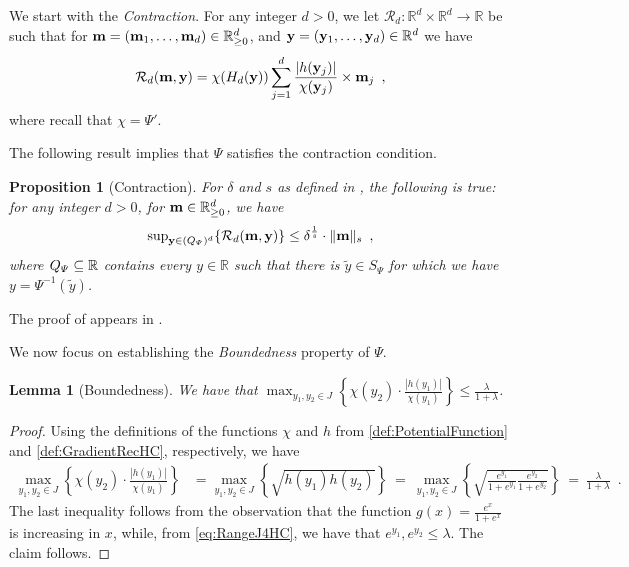 \documentclass[11pt,reqno]{amsart}
\numberwithin{equation}{section}
\newtheorem{lemma}[theorem]{Lemma}
\newtheorem{proposition}[theorem]{Proposition}
\newcommand{\cR}{{\mathcal{R}}}
\newcommand{\blue}[1]{{\color{blue}#1}}
\newcommand{\cadmiumgreen}[1]{{\color{cadmiumgreen}#1}}
\newcommand{\cadmiumorange}[1]{{\color{cadmiumorange}#1}}
\newcommand{\goldenbrown}[1]{{\color{goldenbrown}#1}}
\newcommand{\heliotrope}[1]{{\color{heliotrope}#1}}
\newcommand{\potF}{{\Psi}}
\newcommand{\xdpotF}{\chi}
\newcommand{\logtrecur}{H}
\newcommand{\dlogtrecur}{h}
\newcommand{\ratiorange}{J}
\newcommand{\norm}[2]{\goldenbrown{\|} #1 \goldenbrown{\|}_{#2}}
\newcommand{\abs}[1]{\blue{|}#1\blue{|}}
\renewcommand{\blue}[1]{#1}
\renewcommand{\cadmiumgreen}[1]{#1}
\renewcommand{\cadmiumorange}[1]{#1}
\renewcommand{\goldenbrown}[1]{#1}
\renewcommand{\heliotrope}[1]{#1}
\newcommand{\kx}{\heliotrope{x}}
\newcommand{\ky}{\cadmiumorange{y}}%
\renewcommand{\kx}{x}
\renewcommand{\ky}{\cadmiumgreen{y}}
\begin{document}
We start with the {\em Contraction}. For any integer $d>0$, we let 
$\cR_{d}:\mathbb{R}^d\times \mathbb{R}^d \to \mathbb{R}$ be such that 
for ${\bf m}=({\bf m}_1, \ldots, {\bf m}_d)\in \mathbb{R}^{d}_{\geq 0}$, and 
${\bf \ky}=({\bf \ky}_1, \ldots, {\bf \ky}_d) \in \mathbb{R}^d$ we have  
{\small 
\begin{align}
\cR_{d}({\bf m}, {\bf \ky})={\textstyle \xdpotF(\logtrecur_{d}({\bf \ky})) }\sum^{d}_{j=1}
\frac{ \abs{ \dlogtrecur( {\bf \ky}_j ) }}{ \xdpotF( {\bf \ky}_j )} 
\times {\bf m}_j \enspace, \nonumber
\end{align}
}
where recall that $\xdpotF=\potF'$.


The following result implies that $\potF$ satisfies the contraction condition.
\begin{proposition}[Contraction]\label{prop:PotContracts}
%
For $\delta$ and $s$ as defined in , the following is true: 
for any integer $d>0$, for ${\bf m}\in \mathbb{R}^{d}_{\geq 0}$, we have 
\begin{align}
\sup\nolimits_{{\bf \ky}\in (\easyspace)^d }\{ \cR_{d}({\bf m}, {\bf y}) \} \leq \delta^{\frac{1}{s}} \cdot \norm{ {\bf m}}{s} \enspace,
\end{align}
where $\easyspace \subseteq \mathbb{R}$ contains every $y \in \mathbb{R}$ such that there is 
$\tilde{y} \in S_{\potF} $ for which we have ${y}=\potF^{-1}(\tilde{y})$. 
\end{proposition}

The proof of  appears in .


 We now focus on establishing the {\em Boundedness} property of $\potF$.






\begin{lemma}[Boundedness]\label{lemma:PotBooundedness}
We have that $\textstyle \max_{\ky_1, \ky_2\in \ratiorange }\left\{ \xdpotF(\ky_2) \cdot \frac{|\dlogtrecur(\ky_1)|}{\xdpotF(\ky_1)} \right\} 
\leq \frac{\lambda}{1+\lambda}$.
\end{lemma}
\begin{proof}
Using the definitions of the functions $\xdpotF$ and $\dlogtrecur$ from \eqref{def:PotentialFunction} and 
\eqref{def:GradientRecHC}, respectively, we have
{\small 
\begin{align}
 \max_{\ky_1,\ky_2\in \ratiorange }\left\{ \xdpotF(\ky_2) \cdot \frac{|\dlogtrecur(\ky_1)|}{\xdpotF(\ky_1)} \right\} &=
 \max_{\ky_1,\ky_2\in \ratiorange} \left\{\sqrt{\dlogtrecur(\ky_1)\dlogtrecur(\ky_2) } \right\} %
 \ =\ \max_{\ky_1,\ky_2\in \ratiorange} \left\{\sqrt{ \frac{e^{\ky_1}}{1+e^{\ky_1}}\frac{e^{\ky_2}}{1+e^{\ky_2}} } \right\} 
\ =\ { \frac{\lambda}{1+\lambda}} \enspace. \nonumber 
\end{align}
}
The last inequality follows from the observation that the function $g(\kx)=\frac{e^{\kx}}{1+e^{\kx}}$ is increasing in $\kx$, 
while, from \eqref{eq:RangeJ4HC}, we have that $e^{\ky_1},e^{\ky_2}\leq \lambda$. 
%
The claim follows. 
\end{proof}
\end{document}

